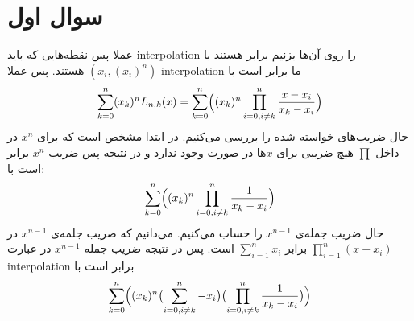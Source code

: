 \documentclass[]{article}
\begin{document}
\printheader

\section*{سوال اول}
عملا پس نقطه‌هایی که باید
interpolation
را روی آن‌ها بزنیم برابر هستند با
$\left(x_i, \left(x_i\right)^n\right)$
هستند. پس عملا
interpolation
ما برابر است با
\begin{gather*}
    \sum_{k=0}^{n} (x_k)^n L_{n, k} (x) = \sum_{k=0}^{n} \Bigl((x_k)^n \prod_{i=0, i \neq k}^{n} \frac{x - x_i}{x_k - x_i}\Bigr)
\end{gather*}
حال ضریب‌های خواسته شده را بررسی می‌کنیم. در ابتدا مشخص است که برای
$x^n$
در داخل
$\prod$
هیچ ضریبی برای
$x$ها
در صورت وجود ندارد و در نتیجه پس ضریب
$x^n$
برابر است با:
\begin{gather*}
    \sum_{k=0}^{n} \Bigl( (x_k)^n \prod_{i=0, i \neq k}^{n} \frac{1}{x_k - x_i} \Bigr)
\end{gather*}
حال ضریب جمله‌ی
$x^{n-1}$
را حساب می‌کنیم. می‌دانیم که ضریب جلمه‌ی
$x^{n-1}$
در
$\prod_{i=1}^n (x + x_i)$
برابر
$\sum_{i=1}^n x_i$
است. پس در نتیجه ضریب جمله
$x^{n-1}$
در عبارت
interpolation
برابر است با
\begin{gather*}
    \sum_{k=0}^{n} \Bigl((x_k)^n \bigl( \sum_{i=0, i \neq k}^{n} -x_i  \bigr) \bigl( \prod_{i=0, i \neq k}^{n} \frac{1}{x_k - x_i} \bigr) \Bigr)
\end{gather*}
\end{document}
